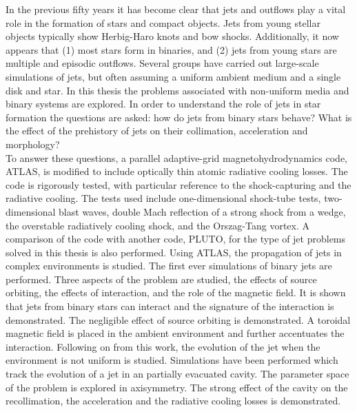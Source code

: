\summary
{
\def\baselinestretch{1.7}
In the previous fifty years it has become clear that jets and outflows play a vital role in the formation of stars and compact objects. Jets from young stellar objects typically show Herbig-Haro knots and bow shocks.
Additionally, it now appears that (1) most stars form in binaries, and (2) jets from young stars are multiple and episodic outflows.
Several groups have carried out large-scale simulations of jets, but often assuming a uniform ambient medium and a single disk and star.
In this thesis the problems associated with non-uniform media and binary systems are explored.
In order to understand the role of jets in star formation the questions are asked: how do jets from binary stars behave? What is the effect of the prehistory of jets on their collimation, acceleration and morphology?
\\To answer these questions, a parallel adaptive-grid magnetohydrodynamics code, ATLAS, is modified to include optically thin atomic radiative cooling losses.
The code is rigorously tested, with particular reference to the shock-capturing and the radiative cooling.
The tests used include one-dimensional shock-tube tests, two-dimensional blast waves, double Mach reflection of a strong shock from a wedge, the overstable radiatively cooling shock, and the Orszag-Tang vortex. 
A comparison of the code with another code, PLUTO, for the type of jet problems
solved in this thesis is also performed.
Using ATLAS, the propagation of jets in complex environments is studied.
The first ever simulations of binary jets are performed.
Three aspects of the problem are studied, the effects of source orbiting, the effects of interaction, and the role of the magnetic field.
It is shown that jets from binary stars can interact and the signature of the interaction is demonstrated.
The negligible effect of source orbiting is demonstrated.
A toroidal magnetic field is placed in the ambient environment and further accentuates the interaction.
Following on from this work, the evolution of the jet when the environment is not uniform is studied.
Simulations have been performed which track the evolution of a jet in an partially evacuated cavity.
The parameter space of the problem is explored in axisymmetry.
The strong effect of the cavity on the recollimation, the acceleration and the radiative cooling losses is demonstrated.
}
